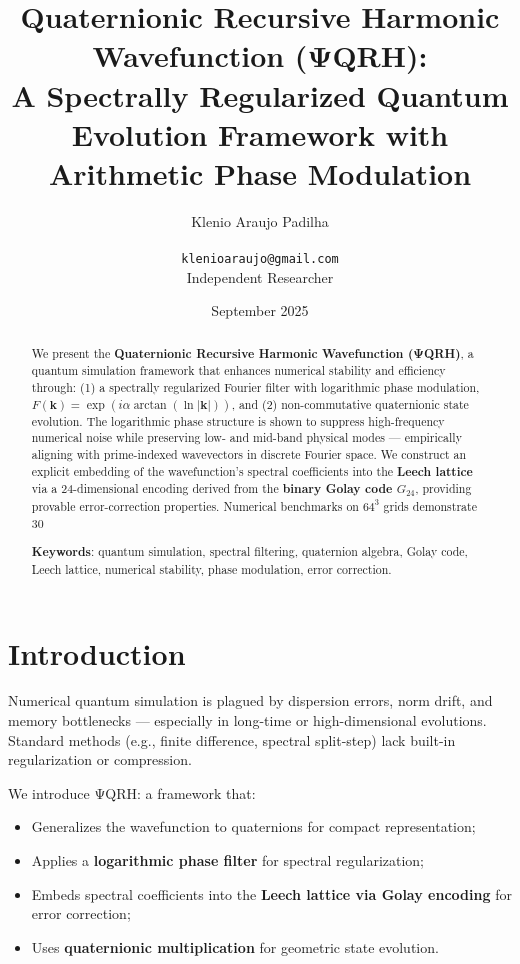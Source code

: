 \documentclass[12pt]{article}
\title{Quaternionic Recursive Harmonic Wavefunction (ΨQRH): \\ A Spectrally Regularized Quantum Evolution Framework with Arithmetic Phase Modulation}
\author{Klenio Araujo Padilha \\ \\ \texttt{klenioaraujo@gmail.com} \\ Independent Researcher}
\date{September 2025}
\begin{document}
\maketitle

\begin{abstract} 
We present the \textbf{Quaternionic Recursive Harmonic Wavefunction (ΨQRH)}, a quantum simulation framework that enhances numerical stability and efficiency through: (1) a spectrally regularized Fourier filter with logarithmic phase modulation, $ F(\mathbf{k}) = \exp(i \alpha \arctan(\ln |\mathbf{k}|)) $, and (2) non-commutative quaternionic state evolution. The logarithmic phase structure is shown to suppress high-frequency numerical noise while preserving low- and mid-band physical modes — empirically aligning with prime-indexed wavevectors in discrete Fourier space. We construct an explicit embedding of the wavefunction’s spectral coefficients into the \textbf{Leech lattice} via a 24-dimensional encoding derived from the \textbf{binary Golay code $ G_{24} $}, providing provable error-correction properties. Numerical benchmarks on $64^3$ grids demonstrate 30%

\textbf{Keywords}: quantum simulation, spectral filtering, quaternion algebra, Golay code, Leech lattice, numerical stability, phase modulation, error correction.
\end{abstract}

\section{Introduction} 
Numerical quantum simulation is plagued by dispersion errors, norm drift, and memory bottlenecks — especially in long-time or high-dimensional evolutions. Standard methods (e.g., finite difference, spectral split-step) lack built-in regularization or compression.

We introduce ΨQRH: a framework that:
\begin{itemize}
    \item Generalizes the wavefunction to quaternions for compact representation;
    \item Applies a \textbf{logarithmic phase filter} for spectral regularization;
    \item Embeds spectral coefficients into the \textbf{Leech lattice via Golay encoding} for error correction;
    \item Uses \textbf{quaternionic multiplication} for geometric state evolution.
\end{itemize}
\end{document}
